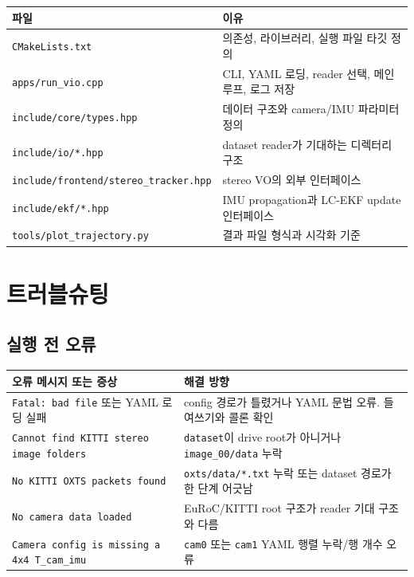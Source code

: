 \documentclass[11pt,a4paper,oneside]{report}
\begin{document}
\begin{longtable}{p{}p{}}
\toprule
파일 & 이유 \\
\midrule
\texttt{CMakeLists.txt} & 의존성, 라이브러리, 실행 파일 타깃 정의 \\
\texttt{apps/run\_vio.cpp} & CLI, YAML 로딩, reader 선택, 메인 루프, 로그 저장 \\
\texttt{include/core/types.hpp} & 데이터 구조와 camera/IMU 파라미터 정의 \\
\texttt{include/io/*.hpp} & dataset reader가 기대하는 디렉터리 구조 \\
\texttt{include/frontend/stereo\_tracker.hpp} & stereo VO의 외부 인터페이스 \\
\texttt{include/ekf/*.hpp} & IMU propagation과 LC-EKF update 인터페이스 \\
\texttt{tools/plot\_trajectory.py} & 결과 파일 형식과 시각화 기준 \\
\bottomrule
\end{longtable}

\chapter{트러블슈팅}

\section{실행 전 오류}

\begin{longtable}{p{}p{}}
\toprule
오류 메시지 또는 증상 & 해결 방향 \\
\midrule
\texttt{Fatal: bad file} 또는 YAML 로딩 실패 & config 경로가 틀렸거나 YAML 문법 오류. 들여쓰기와 콜론 확인 \\
\texttt{Cannot find KITTI stereo image folders} & \texttt{dataset}이 drive root가 아니거나 \texttt{image\_00/data} 누락 \\
\texttt{No KITTI OXTS packets found} & \texttt{oxts/data/*.txt} 누락 또는 dataset 경로가 한 단계 어긋남 \\
\texttt{No camera data loaded} & EuRoC/KITTI root 구조가 reader 기대 구조와 다름 \\
\texttt{Camera config is missing a 4x4 T\_cam\_imu} & \texttt{cam0} 또는 \texttt{cam1} YAML 행렬 누락/행 개수 오류 \\
\bottomrule
\end{longtable}
\end{document}
